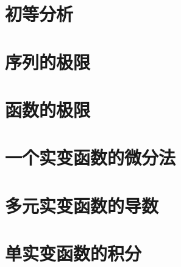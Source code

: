 \chapter{初等分析}





\chapter{序列的极限}




\chapter{函数的极限}



\chapter{一个实变函数的微分法}






\chapter{多元实变函数的导数}










\chapter{单实变函数的积分}










